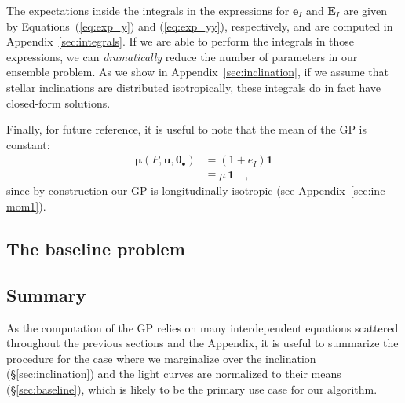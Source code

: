 \documentclass[modern]{aastex62}
\begin{document}
%
The expectations inside the integrals in the expressions for
$\mathbf{e}_I$ and $\mathbf{E}_I$
are given by
Equations~(\ref{eq:exp_y}) and (\ref{eq:exp_yy}), respectively, and
are computed in Appendix~\ref{sec:integrals}.
%
If we are able to perform the integrals in those expressions,
we can \emph{dramatically} reduce the number of
parameters in our ensemble problem.
%
As we show in Appendix~\ref{sec:inclination}, if we assume that stellar
inclinations are distributed isotropically, these integrals
do in fact have closed-form solutions.

%
Finally, for future reference, it is useful to note that the mean of the GP
is constant:
%
\begin{align}
    \label{eq:scalar-mean}
    \pmb{\mu}(P, \mathbf{u}, \pmb{\theta}_\bullet)
     & =  (1 + e_I)\mathbf{1}
    \nonumber                 \\
     & \equiv
    \mu \, \mathbf{1}
    \quad,
\end{align}
%
since by construction our GP is longitudinally isotropic
(see Appendix~\ref{sec:inc-mom1}).

\subsection{The baseline problem}

\subsection{Summary}
\label{sec:summary}
%
As the computation of the GP relies on many interdependent equations
scattered throughout the previous sections and the Appendix, it
is useful to summarize the procedure for the case where we marginalize
over the inclination (\S\ref{sec:inclination}) and the light curves are
normalized to their means (\S\ref{sec:baseline}), which is likely to be the primary
use case for our algorithm.
\end{document}
